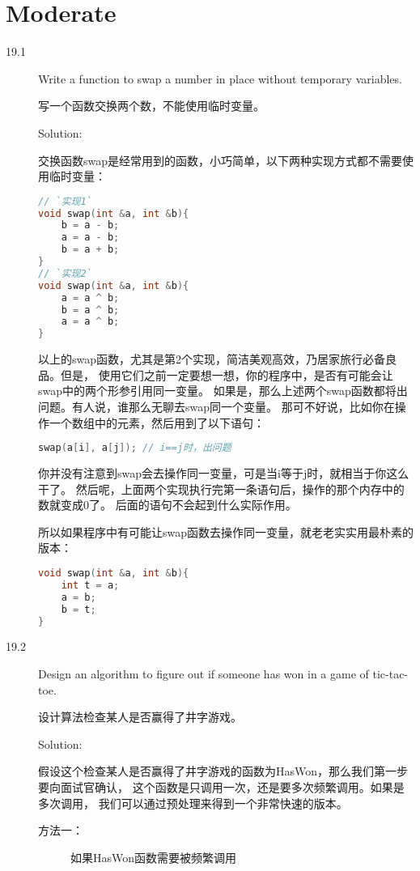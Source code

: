\chapter{Moderate}

\begin{description}
\item[19.1] Write a function to swap a number in place without temporary variables.

写一个函数交换两个数，不能使用临时变量。

Solution: 

交换函数swap是经常用到的函数，小巧简单，以下两种实现方式都不需要使用临时变量：
\begin{lstlisting}[language=C++]
// `实现1`
void swap(int &a, int &b){
    b = a - b;
    a = a - b;
    b = a + b;
}
// `实现2`
void swap(int &a, int &b){
    a = a ^ b;
    b = a ^ b;
    a = a ^ b;
}
\end{lstlisting}
以上的swap函数，尤其是第2个实现，简洁美观高效，乃居家旅行必备良品。但是， 使用它们之前一定要想一想，你的程序中，是否有可能会让swap中的两个形参引用同一变量。 如果是，那么上述两个swap函数都将出问题。有人说，谁那么无聊去swap同一个变量。 那可不好说，比如你在操作一个数组中的元素，然后用到了以下语句：
\begin{lstlisting}[language=C++]
swap(a[i], a[j]); // i==j时，出问题
\end{lstlisting}
你并没有注意到swap会去操作同一变量，可是当i等于j时，就相当于你这么干了。 然后呢，上面两个实现执行完第一条语句后，操作的那个内存中的数就变成0了。 后面的语句不会起到什么实际作用。

所以如果程序中有可能让swap函数去操作同一变量，就老老实实用最朴素的版本：
\begin{lstlisting}[language=C++]
void swap(int &a, int &b){
    int t = a;
    a = b;
    b = t;
}
\end{lstlisting}
%


\item[19.2] Design an algorithm to figure out if someone has won in a game of tic-tac-toe.

设计算法检查某人是否赢得了井字游戏。

Solution: 

假设这个检查某人是否赢得了井字游戏的函数为HasWon，那么我们第一步要向面试官确认， 这个函数是只调用一次，还是要多次频繁调用。如果是多次调用， 我们可以通过预处理来得到一个非常快速的版本。
\begin{description}
\item[方法一：] 如果HasWon函数需要被频繁调用


\end{description}
\end{description}
